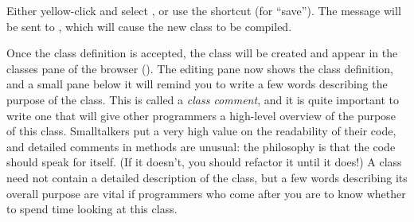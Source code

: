 \documentclass[a4paper,10pt,twoside]{book}
\begin{document}
Either yellow-click and select , or use the shortcut  (for ``save'').
The message will be sent to , which will cause the new class to be compiled.

Once the class definition is accepted, the class will be created and appear in the classes pane of the browser ().
The editing pane now shows the class definition, and a small pane below it will remind you to write a few words describing the purpose of the class. This is called a \emph{class comment}, and it is quite important to write one that will give other programmers a high-level overview of the purpose of this class.
Smalltalkers put a very high value on the readability of their code, and detailed comments in methods are unusual: the philosophy is that the code should speak for itself. (If it doesn't, you should refactor it until it does!) A class  need not contain a detailed description of the class, but a few words describing its overall purpose are vital if programmers who come after you are to know whether to spend time looking at this class.

\end{document}
